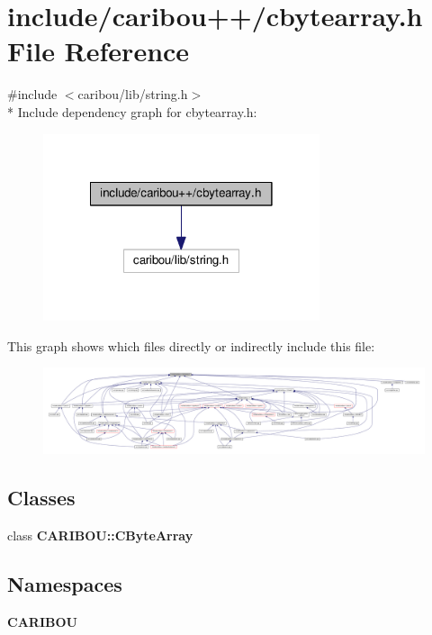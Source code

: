 \section{include/caribou++/cbytearray.h File Reference}
\label{cbytearray_8h}
{\ttfamily \#include $<$caribou/lib/string.\-h$>$}\\*
Include dependency graph for cbytearray.\-h\-:\nopagebreak
\begin{figure}[H]
\begin{center}
\leavevmode
\includegraphics[width=230pt]{cbytearray_8h__incl}
\end{center}
\end{figure}
This graph shows which files directly or indirectly include this file\-:\nopagebreak
\begin{figure}[H]
\begin{center}
\leavevmode
\includegraphics[width=350pt]{cbytearray_8h__dep__incl}
\end{center}
\end{figure}
\subsection*{Classes}
\begin{DoxyCompactItemize}
\item 
class {\bf C\-A\-R\-I\-B\-O\-U\-::\-C\-Byte\-Array}
\end{DoxyCompactItemize}
\subsection*{Namespaces}
\begin{DoxyCompactItemize}
\item 
{\bf C\-A\-R\-I\-B\-O\-U}
\end{DoxyCompactItemize}
